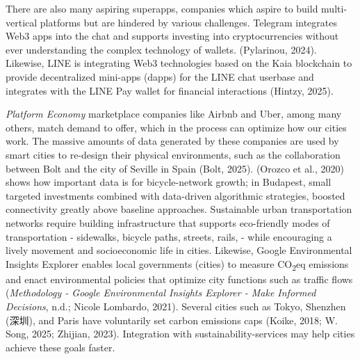 \documentclass[
  12pt,
  letterpaper,
  DIV=11,
  numbers=noendperiod]{scrartcl}
\begin{document}
There are also many aspiring superapps, companies which aspire to build
multi-vertical platforms but are hindered by various challenges.
Telegram integrates Web3 apps into the chat and supports investing into
cryptocurrencies without ever understanding the complex technology of
wallets. (Pylarinou, 2024). Likewise, LINE is integrating Web3
technologies based on the Kaia blockchain to provide decentralized
mini-apps (dapps) for the LINE chat userbase and integrates with the
LINE Pay wallet for financial interactions (Hintzy, 2025).

\emph{Platform Economy} marketplace companies like Airbnb and Uber,
among many others, match demand to offer, which in the process can
optimize how our cities work. The massive amounts of data generated by
these companies are used by smart cities to re-design their physical
environments, such as the collaboration between Bolt and the city of
Seville in Spain (Bolt, 2025). (Orozco et al., 2020) shows how important
data is for bicycle-network growth; in Budapest, small targeted
investments combined with data-driven algorithmic strategies, boosted
connectivity greatly above baseline approaches. Sustainable urban
transportation networks require building infrastructure that supports
eco-friendly modes of transportation - sidewalks, bicycle paths,
streets, rails, - while encouraging a lively movement and socioeconomic
life in cities. Likewise, Google Environmental Insights Explorer enables
local governments (cities) to measure CO\textsubscript{2}eq emissions
and enact environmental policies that optimize city functions such as
traffic flows (\emph{Methodology - {Google Environmental Insights
Explorer} - {Make Informed Decisions}}, n.d.; Nicole Lombardo, 2021).
Several cities such as Tokyo, Shenzhen (深圳), and Paris have
voluntarily set carbon emissions caps (Koike, 2018; W. Song, 2025;
Zhijian, 2023). Integration with sustainability-services may help cities
achieve these goals faster.

\def\pandoctableshortcapt{Platform Economy Concepts}
\end{document}
